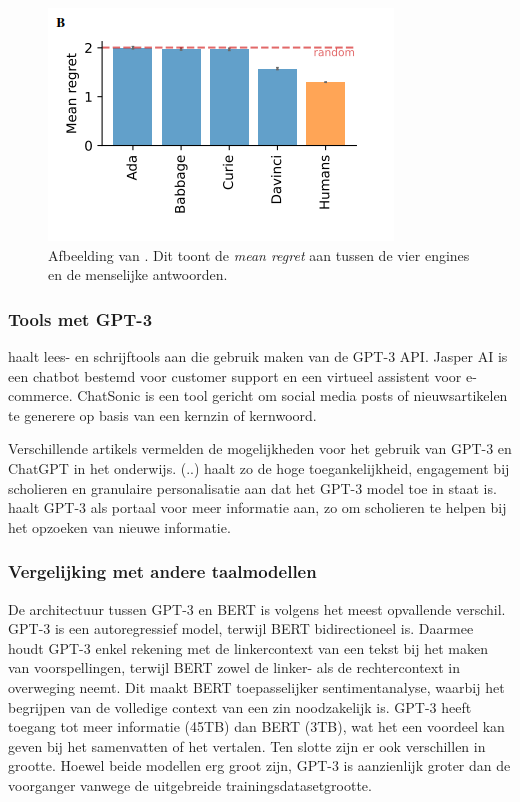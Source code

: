 \begin{figure}
	\begin{center}
		\includegraphics{img/chatgpt-engines-mean-regret.png}
		\caption{Afbeelding van \textcite{Binz2023}. Dit toont de \textit{mean regret} aan tussen de vier engines en de menselijke antwoorden.}
	\end{center}
\end{figure}

\subsubsection{Tools met GPT-3}

\textcite{Mottesi2023} haalt lees- en schrijftools aan die gebruik maken van de GPT-3 API. Jasper AI is een chatbot bestemd voor customer support en een virtueel assistent voor e-commerce. ChatSonic is een tool gericht om social media posts of nieuwsartikelen te generere op basis van een kernzin of kernwoord. 

Verschillende artikels vermelden de mogelijkheden voor het gebruik van GPT-3 en ChatGPT in het onderwijs. (..) haalt zo de hoge toegankelijkheid, engagement bij scholieren en granulaire personalisatie aan dat het GPT-3 model toe in staat is. \textcite{Garg2022} haalt GPT-3 als portaal voor meer informatie aan, zo om scholieren te helpen bij het opzoeken van nieuwe informatie.

\subsubsection{Vergelijking met andere taalmodellen}

De architectuur tussen GPT-3 en BERT is volgens \textcite{Mottesi2023} het meest opvallende verschil. GPT-3 is een autoregressief model, terwijl BERT bidirectioneel is. Daarmee houdt GPT-3 enkel rekening met de linkercontext van een tekst bij het maken van voorspellingen, terwijl BERT zowel de linker- als de rechtercontext in overweging neemt. Dit maakt BERT toepasselijker sentimentanalyse, waarbij het begrijpen van de volledige context van een zin noodzakelijk is. GPT-3 heeft toegang tot meer informatie (45TB) dan BERT (3TB), wat het een voordeel kan geven bij het samenvatten of het vertalen. Ten slotte zijn er ook verschillen in grootte. Hoewel beide modellen erg groot zijn, GPT-3 is aanzienlijk groter dan de voorganger vanwege de uitgebreide trainingsdatasetgrootte.

